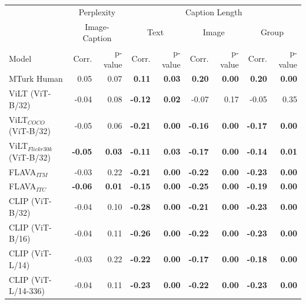 \begin{table}[ht]
\centering
\begin{adjustbox}{max width=\textwidth}
\begin{tabular}{l|rr|rrrrrr}
\toprule
 & \multicolumn{2}{c|}{Perplexity} &  \multicolumn{6}{c}{Caption Length}\\
 & \multicolumn{2}{c|}{Image-Caption} &  \multicolumn{2}{c}{Text} &  \multicolumn{2}{c}{Image} &  \multicolumn{2}{c}{Group}\\
 Model      &   Corr. &   p-value & Corr. &   p-value & Corr. &   p-value & Corr. &   p-value\\\midrule 
MTurk Human                         & 0.05           & 0.07          & \textbf{0.11}  & \textbf{0.03} & \textbf{0.20}  & \textbf{0.00} & \textbf{0.20}  & \textbf{0.00} \\
 ViLT (ViT-B/32)                     & -0.04          & 0.08          & \textbf{-0.12} & \textbf{0.02} & -0.07          & 0.17          & -0.05          & 0.35          \\
 ViLT$_{COCO}$ (ViT-B/32)            & -0.05          & 0.06          & \textbf{-0.21} & \textbf{0.00} & \textbf{-0.16} & \textbf{0.00} & \textbf{-0.17} & \textbf{0.00} \\
 ViLT$_{Flickr30k}$ (ViT-B/32)       & \textbf{-0.05} & \textbf{0.03} & \textbf{-0.11} & \textbf{0.03} & \textbf{-0.17} & \textbf{0.00} & \textbf{-0.14} & \textbf{0.01} \\
 FLAVA$_{ITM}$                       & -0.03          & 0.22          & \textbf{-0.21} & \textbf{0.00} & \textbf{-0.22} & \textbf{0.00} & \textbf{-0.23} & \textbf{0.00} \\
 FLAVA$_{ITC}$                       & \textbf{-0.06} & \textbf{0.01} & \textbf{-0.15} & \textbf{0.00} & \textbf{-0.25} & \textbf{0.00} & \textbf{-0.19} & \textbf{0.00} \\
 CLIP (ViT-B/32)                     & -0.04          & 0.10          & \textbf{-0.28} & \textbf{0.00} & \textbf{-0.21} & \textbf{0.00} & \textbf{-0.23} & \textbf{0.00} \\
 CLIP (ViT-B/16)                     & -0.04          & 0.11          & \textbf{-0.26} & \textbf{0.00} & \textbf{-0.22} & \textbf{0.00} & \textbf{-0.23} & \textbf{0.00} \\
 CLIP (ViT-L/14)                     & -0.03          & 0.22          & \textbf{-0.22} & \textbf{0.00} & \textbf{-0.17} & \textbf{0.00} & \textbf{-0.18} & \textbf{0.00} \\
 CLIP (ViT-L/14-336)                 & -0.04          & 0.11          & \textbf{-0.23} & \textbf{0.00} & \textbf{-0.22} & \textbf{0.00} & \textbf{-0.23} & \textbf{0.00} \\

\end{tabular}
\end{adjustbox}
\end{table}
